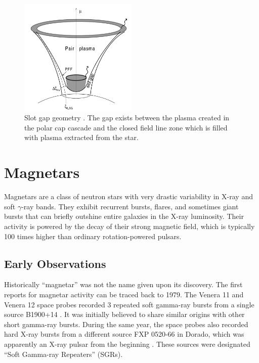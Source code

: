 \begin{figure}[h]
  \centering
  \includegraphics[width=0.5\textwidth]{pics/intro/slot-gap2.png}
  \caption[Slot gap geometry.]{Slot gap geometry \citep{muslimov_extended_2003}.
  The gap exists between the plasma created in the polar cap cascade and the
  closed field line zone which is filled with plasma extracted from the star.}
  \label{fig:slot-gap}
\end{figure}

\section{Magnetars}
\label{sec:intro-magnetars}

Magnetars are a class of neutron stars with very drastic variability in X-ray
and soft $\gamma$-ray bands. They exhibit recurrent bursts, flares, and
sometimes giant bursts that can briefly outshine entire galaxies in the X-ray
luminosity. Their activity is powered by the decay of their strong magnetic
field, which is typically 100 times higher than ordinary rotation-powered
pulsars.

\subsection{Early Observations}
\label{sec:intro-magnetar-observation}

Historically ``magnetar'' was not the name given upon its discovery. The first
reports for magnetar activity can be traced back to 1979. The Venera 11 and
Venera 12 space probes recorded 3 repeated soft gamma-ray bursts from a single
source B1900+14 \citep{mazets_soft_1979}. It was initially believed to share
similar origins with other short gamma-ray bursts. During the same year, the
space probes also recorded hard X-ray bursts from a different source FXP 0520-66
in Dorado, which was apparently an X-ray pulsar from the beginning
\citep{mazets_observations_1979}. These sources were designated ``Soft Gamma-ray
Repeaters'' (SGRs).

